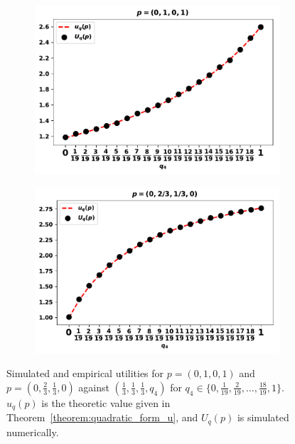 \begin{figure}[!htbp]
    \begin{center}
        \begin{subfigure}{0.45\textwidth}
            \includegraphics[width=\linewidth]{src/chapters/05/paper/Memory-size-in-the-prisoners-dilemma/img/validation_against_player_one.pdf}
        \end{subfigure}
        \begin{subfigure}{0.45\textwidth}
            \includegraphics[width=\linewidth]{src/chapters/05/paper/Memory-size-in-the-prisoners-dilemma/img/validation_against_player_two.pdf}
        \end{subfigure}
    \end{center}
    \caption{Simulated and empirical utilities for \(p = (0, 1, 0, 1)\)
    and \(p = (0, \frac{2}{3}, \frac{1}{3}, 0)\) against \((\frac{1}{3}, \frac{1}{3}, \frac{1}{3}, q_4)\) for
    \(q_4 \in \{0,  \frac{1}{19}, \frac{2}{19}, \dots, \frac{18}{19}, 1\}\).
    \(u_q(p)\) is the theoretic value given in Theorem~\ref{theorem:quadratic_form_u},
    and \(U_q(p)\) is simulated numerically.}
    \label{fig:analytical_simulated}
\end{figure}

